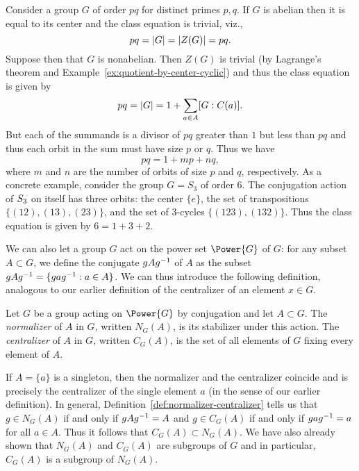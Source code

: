 \begin{example}
    Consider a group \(G\) of order \(pq\) for distinct primes \(p, q\). If
    \(G\) is abelian then it is equal to its center and the class equation is
    trivial, viz.,
    \[
        pq = \lvert G \rvert = \lvert Z(G) \rvert = pq.
    \]
    Suppose then that \(G\) is nonabelian. Then \(Z(G)\) is trivial (by
    Lagrange's theorem and Example~\ref{ex:quotient-by-center-cyclic}) and thus
    the class equation is given by
    \[
        pq = \lvert G \rvert = 1 + \sum_{a \in A} [G : C(a)].
    \]
    But each of the summands is a divisor of \(pq\) greater than \(1\) but less
    than \(pq\) and thus each orbit in the sum must have size \(p\) or \(q\).
    Thus we have
    \[
        pq = 1 + mp + nq,
    \]
    where \(m\) and \(n\) are the number of orbits of size \(p\) and \(q\),
    respectively. As a concrete example, consider the group \(G = S_3\) of order
    \(6\). The conjugation action of \(S_{3}\) on itself has three orbits:
    the center \(\{e\}\), the set of transpositions \(\{(12), (13), (23)\}\),
    and the set of 3-cycles \(\{(123), (132)\}\). Thus the class equation is
    given by \(6 = 1 + 3 + 2\).
\end{example}

We can also let a group \(G\) act on the power set \(\Power{G}\) of \(G\): for
any subset \(A \subset G\), we define the conjugate \(gAg^{-1}\) of \(A\) as the
subset \(gAg^{-1} = \{gag^{-1} : a \in A\}\). We can thus introduce the following
definition, analogous to our earlier definition of the centralizer of an element
\(x \in G\).

\begin{definition}
    \label{def:normalizer-centralizer}
    Let \(G\) be a group acting on \(\Power{G}\) by conjugation and let \(A
    \subset G\). The \emph{normalizer} of \(A\) in \(G\), written \(N_G(A)\), is
    its stabilizer under this action. The \emph{centralizer} of \(A\) in \(G\),
    written \(C_G(A)\), is the set of all elements of \(G\) fixing every element
    of \(A\).
\end{definition}

If \(A = \{a\}\) is a singleton, then the normalizer and the centralizer
coincide and is precisely the centralizer of the single element \(a\) (in the
sense of our earlier definition). In general,
Definition~\ref{def:normalizer-centralizer} tells us that \(g \in N_G(A)\) if
and only if \(gAg^{-1} = A\) and \(g \in C_G(A)\) if and only if \(gag^{-1} = a\)
for all \(a \in A\). Thus it follows that \(C_G(A) \subset N_G(A)\). We have
also already shown that \(N_G(A)\) and \(C_G(A)\) are subgroups of \(G\) and in
particular, \(C_G(A)\) is a subgroup of \(N_G(A)\).

